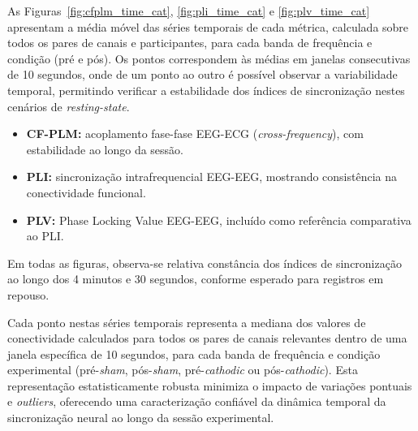 As Figuras~\ref{fig:cfplm_time_cat}, \ref{fig:pli_time_cat} e \ref{fig:plv_time_cat} apresentam a média móvel das séries temporais de cada métrica, calculada sobre todos os pares de canais e participantes, para cada banda de frequência e condição (pré e pós). Os pontos correspondem às médias em janelas consecutivas de 10 segundos, onde de um ponto ao outro é possível observar a variabilidade temporal, permitindo verificar a estabilidade dos índices de sincronização nestes cenários de \textit{resting-state}.
\begin{itemize}
  \item \textbf{CF-PLM:} acoplamento fase-fase EEG-ECG (\textit{cross-frequency}), com estabilidade ao longo da sessão.
  \item \textbf{PLI:} sincronização intrafrequencial EEG-EEG, mostrando consistência na conectividade funcional.
  \item \textbf{PLV:} Phase Locking Value EEG-EEG, incluído como referência comparativa ao PLI.
\end{itemize}

Em todas as figuras, observa-se relativa constância dos índices de sincronização ao longo dos 4 minutos e 30 segundos, conforme esperado para registros em repouso.

Cada ponto nestas séries temporais representa a mediana dos valores de conectividade calculados para todos os pares de canais relevantes dentro de uma janela específica de 10 segundos, para cada banda de frequência e condição experimental (pré-\textit{sham}, pós-\textit{sham}, pré-\textit{cathodic} ou pós-\textit{cathodic}). Esta representação estatisticamente robusta minimiza o impacto de variações pontuais e \textit{outliers}, oferecendo uma caracterização confiável da dinâmica temporal da sincronização neural ao longo da sessão experimental.